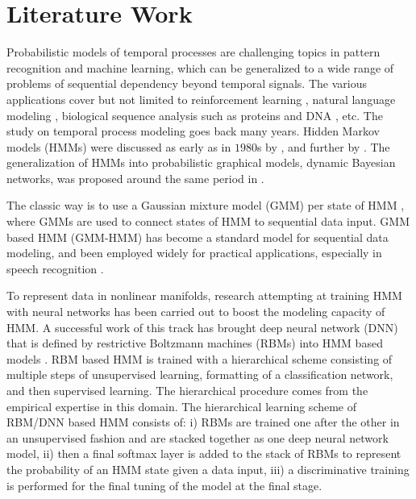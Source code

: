 \section{Literature Work}
Probabilistic models of temporal processes are challenging topics in pattern recognition and machine learning, which can be generalized to a wide range of problems of sequential dependency beyond temporal signals.
The various applications cover but not limited to reinforcement learning \cite{ding2018reinforcementhmm,levine2018reinforcementReview}, natural language modeling \cite{khan2016survey,Hariyanti_2019}, biological sequence analysis such as proteins \cite{ASHWIN20172} and DNA \cite{ren2015dna}, etc.
The study on temporal process modeling goes back many years.
Hidden Markov models (HMMs) were discussed as early as in $1980$s by \cite{rabiner1986intro_hmm}, and further by \cite{rabiner1989tutorialhmm}.
The generalization of HMMs into probabilistic graphical models, dynamic Bayesian networks, was proposed around the same period in \cite{dean1989reasoning}.

The classic way is to use a Gaussian mixture model (GMM) per state of HMM \cite{juang1986maximum}, where GMMs are used to connect states of HMM to sequential data input. GMM based HMM (GMM-HMM) has become a standard model for sequential data modeling, and been employed widely for practical applications, especially in speech recognition \cite{gales2008application,chatterjee2011auditory}.

To represent data in nonlinear manifolds, research attempting at training HMM with neural networks has been carried out to boost the modeling capacity of HMM. A successful work of this track has brought deep neural network (DNN) that is defined by restrictive Boltzmann machines (RBMs) \cite{Hinton2012} into HMM based models \cite{hinton2012deepSpeech,li2013hybrid,Miao2013ImprovingLC}. RBM based HMM is trained with a hierarchical scheme consisting of multiple steps of unsupervised learning, formatting of a classification network, and then supervised learning. The hierarchical procedure comes from the empirical expertise in this domain. The hierarchical learning scheme of RBM/DNN based HMM consists of: i) RBMs are trained one after the other in an unsupervised fashion and are stacked together as one deep neural network model, ii) then a final softmax layer is added to the stack of RBMs to represent the probability of an HMM state given a data input, iii) a discriminative training is performed for the final tuning of the model at the final stage.

